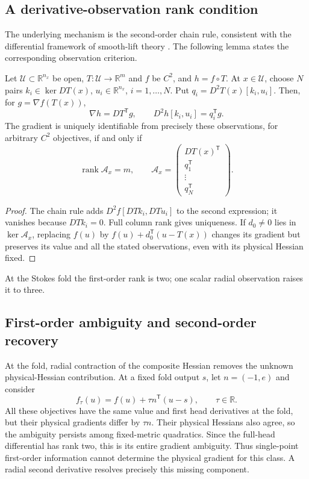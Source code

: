 \subsection{A derivative-observation rank condition}
The underlying mechanism is the second-order chain rule, consistent with the differential framework of smooth-lift theory \cite{lifts}. The following lemma states the corresponding observation criterion.
\begin{lemma}
\label{lem:observation}
Let $\mathcal U\subset\mathbb R^{n_x}$ be open, $T:\mathcal U\to\mathbb R^m$ and $f$ be $C^2$, and $h=f\circ T$. At $x\in\mathcal U$, choose $N$ pairs $k_i\in\ker DT(x)$, $u_i\in\mathbb R^{n_x}$, $i=1,\ldots,N$. Put $q_i=D^2T(x)[k_i,u_i]$. Then, for $g=\nabla f(T(x))$,
\begin{equation}
 \nabla h=DT^{\mathsf T}g,\qquad
 D^2h[k_i,u_i]=q_i^{\mathsf T}g.
 \label{eq:observation}
\end{equation}
The gradient is uniquely identifiable from precisely these observations, for arbitrary $C^2$ objectives, if and only if
\begin{equation}
 \operatorname{rank}\mathcal A_x=m,\qquad
 \mathcal A_x=\begin{pmatrix}DT(x)^{\mathsf T}\\q_1^{\mathsf T}\\\vdots\\q_N^{\mathsf T}\end{pmatrix}.
 \label{eq:observationrank}
\end{equation}
\end{lemma}
\begin{proof}
The chain rule adds $D^2f[DTk_i,DTu_i]$ to the second expression; it vanishes because $DTk_i=0$. Full column rank gives uniqueness. If $d_0\ne0$ lies in $\ker\mathcal A_x$, replacing $f(u)$ by $f(u)+d_0^{\mathsf T}(u-T(x))$ changes its gradient but preserves its value and all the stated observations, even with its physical Hessian fixed.
\end{proof}
At the Stokes fold the first-order rank is two; one scalar radial observation raises it to three.

\subsection{First-order ambiguity and second-order recovery}
At the fold, radial contraction of the composite Hessian removes the unknown physical-Hessian contribution. At a fixed fold output $s$, let $n=(-1,e)$ and consider
\begin{equation}
 f_\tau(u)=f(u)+\tau n^{\mathsf T}(u-s),\qquad \tau\in\mathbb R.
 \label{eq:ambiguity}
\end{equation}
All these objectives have the same value and first head derivatives at the fold, but their physical gradients differ by $\tau n$. Their physical Hessians also agree, so the ambiguity persists among fixed-metric quadratics. Since the full-head differential has rank two, this is its entire gradient ambiguity. Thus single-point first-order information cannot determine the physical gradient for this class. A radial second derivative resolves precisely this missing component.

